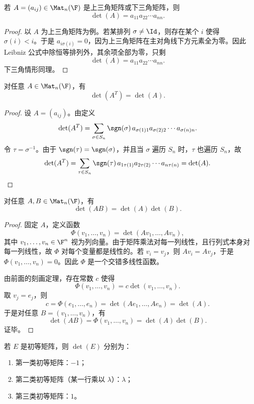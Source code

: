 \begin{proposition}[三角矩阵的行列式]
若 $A=(a_{ij})\in\Mat_n(\F)$ 是上三角矩阵或下三角矩阵，则
\[
\det(A)=a_{11}a_{22}\cdots a_{nn}.
\]
\end{proposition}

\begin{proof}
以 $A$ 为上三角矩阵为例。若某排列 $\sigma\ne \Id$，则存在某个 $i$ 使得 $\sigma(i)<i$。于是 $a_{i\sigma(i)}=0$，因为上三角矩阵在主对角线下方元素全为零。因此 Leibniz 公式中除恒等排列外，其余项全部为零，只剩
\[
\det(A)=a_{11}a_{22}\cdots a_{nn}.
\]
下三角情形同理。
\end{proof}

\begin{theorem}[转置不改变行列式]
对任意 $A\in\Mat_n(\F)$，有
\[
\det(A^T)=\det(A).
\]
\end{theorem}

\begin{proof}
设 $A=(a_{ij})$。由定义
\[
\det(A^T)=\sum_{\sigma\in S_n}\sgn(\sigma)\,a_{\sigma(1)1}a_{\sigma(2)2}\cdots a_{\sigma(n)n}.
\]
令 $\tau=\sigma^{-1}$。由于 $\sgn(\tau)=\sgn(\sigma)$，并且当 $\sigma$ 遍历 $S_n$ 时，$\tau$ 也遍历 $S_n$，故
\[
\det(A^T)=\sum_{\tau\in S_n}\sgn(\tau)\,a_{1\tau(1)}a_{2\tau(2)}\cdots a_{n\tau(n)}=\det(A).
\]
\end{proof}

\begin{theorem}[乘积的行列式]
对任意 $A,B\in\Mat_n(\F)$，有
\[
\det(AB)=\det(A)\det(B).
\]
\end{theorem}

\begin{proof}
固定 $A$，定义函数
\[
\Phi(v_1,\dots,v_n)=\det(Av_1,\dots,Av_n),
\]
其中 $v_1,\dots,v_n\in\F^n$ 视为列向量。由于矩阵乘法对每一列线性，且行列式本身对每一列线性，故 $\Phi$ 对每个变量都是线性的。若 $v_i=v_j$，则 $Av_i=Av_j$，于是 $\Phi(v_1,\dots,v_n)=0$。因此 $\Phi$ 是一个交错多线性函数。

由前面的刻画定理，存在常数 $c$ 使得
\[
\Phi(v_1,\dots,v_n)=c\det(v_1,\dots,v_n).
\]
取 $v_j=e_j$，则
\[
c=\Phi(e_1,\dots,e_n)=\det(Ae_1,\dots,Ae_n)=\det(A).
\]
于是对任意 $B=(v_1,\dots,v_n)$，有
\[
\det(AB)=\Phi(v_1,\dots,v_n)=\det(A)\det(B).
\]
证毕。
\end{proof}

\begin{corollary}
若 $E$ 是初等矩阵，则 $\det(E)$ 分别为：
\begin{enumerate}[label=(\arabic*)]
  \item 第一类初等矩阵：$-1$；
  \item 第二类初等矩阵（某一行乘以 $\lambda$）：$\lambda$；
  \item 第三类初等矩阵：$1$。
\end{enumerate}
\end{corollary}

